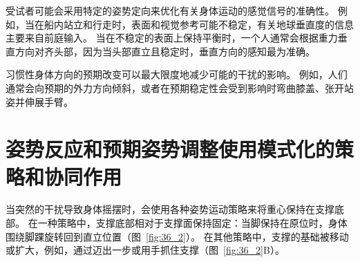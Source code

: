 受试者可能会采用特定的姿势定向来优化有关身体运动的感觉信号的准确性。
例如，当在船内站立和行走时，表面和视觉参考可能不稳定，有关地球垂直度的信息主要来自前庭输入。
当在不稳定的表面上保持平衡时，一个人通常会根据重力垂直方向对齐头部，因为当头部直立且稳定时，垂直方向的感知最为准确。


习惯性身体方向的预期改变可以最大限度地减少可能的干扰的影响。
例如，人们通常会向预期的外力方向倾斜，或者在预期稳定性会受到影响时弯曲膝盖、张开站姿并伸展手臂。



\section{姿势反应和预期姿势调整使用模式化的策略和协同作用}

当突然的干扰导致身体摇摆时，会使用各种姿势运动策略来将重心保持在支撑底部。
在一种策略中，支撑底部相对于支撑面保持固定：当脚保持在原位时，身体围绕脚踝旋转回到直立位置（图~\ref{fig:36_2}）。
在其他策略中，支撑的基础被移动或扩大，例如，通过迈出一步或用手抓住支撑（图~\ref{fig:36_2}B）。


